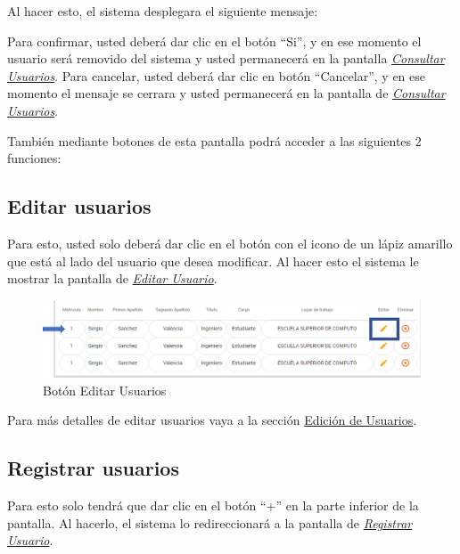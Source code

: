\begin{enumerate}
                Al hacer esto, el sistema desplegara el siguiente mensaje:
                
            
                Para confirmar, usted deberá dar clic en el botón “Si”, y en ese momento el usuario será removido del sistema y usted permanecerá en la pantalla \hyperlink{consultarUs}{\textit{Consultar Usuarios}}.
                Para cancelar, usted deberá dar clic en botón “Cancelar”, y en ese momento el mensaje se cerrara y usted permanecerá en la pantalla de \hyperlink{consultarUs}{\textit{Consultar Usuarios}}.\\
        
        \end{enumerate}

        También mediante botones de esta pantalla podrá acceder a las siguientes 2 funciones:

        \subsection{Editar usuarios}

            Para esto, usted solo deberá dar clic en el botón con el icono de un lápiz amarillo que está al lado del usuario que desea modificar. Al hacer esto el sistema le mostrar la pantalla   de \hyperlink{editarUs}{\textit{Editar Usuario}}.
            
            \begin{figure}[!hbtp]
                \centering
                \hypertarget{editar}{\includegraphics[width=0.7\linewidth]{images/SP5/BtnEditar}}
                \caption{Botón Editar Usuarios}
                \label{editar}
            \end{figure}
            
            Para más detalles de editar usuarios vaya a la sección \hyperref[editar-user]{Edición de Usuarios}.
        
        \subsection{Registrar  usuarios}

            Para esto solo tendrá que dar clic en el botón “+” en la parte inferior de la pantalla. Al hacerlo, el sistema  lo redireccionará a la pantalla de \hyperlink{registrarUs}{\textit{Registrar Usuario}}.
        
